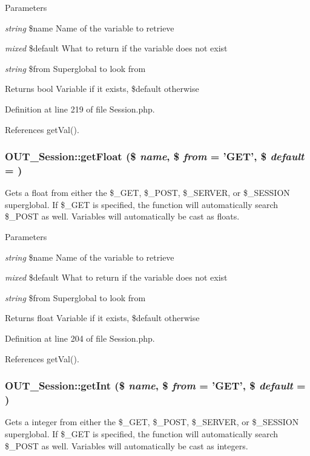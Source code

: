 \begin{DoxyParams}{Parameters}
\item[{\em string}]\$name Name of the variable to retrieve \item[{\em mixed}]\$default What to return if the variable does not exist \item[{\em string}]\$from Superglobal to look from\end{DoxyParams}
\begin{DoxyReturn}{Returns}
bool Variable if it exists, \$default otherwise 
\end{DoxyReturn}


Definition at line 219 of file Session.php.

References getVal().\hypertarget{classOUT__Session_ada05962a25467070b6ca9ffa6692d4c3}{
\subsubsection[{getFloat}]{\setlength{\rightskip}{0pt plus 5cm}OUT\_\-Session::getFloat (\$ {\em name}, \/  \$ {\em from} = {\ttfamily 'GET'}, \/  \$ {\em default} = {})}}
\label{d6/d75/classOUT__Session_ada05962a25467070b6ca9ffa6692d4c3}
Gets a float from either the \$\_\-GET, \$\_\-POST, \$\_\-SERVER, or \$\_\-SESSION superglobal. If \$\_\-GET is specified, the function will automatically search \$\_\-POST as well. Variables will automatically be cast as floats.


\begin{DoxyParams}{Parameters}
\item[{\em string}]\$name Name of the variable to retrieve \item[{\em mixed}]\$default What to return if the variable does not exist \item[{\em string}]\$from Superglobal to look from\end{DoxyParams}
\begin{DoxyReturn}{Returns}
float Variable if it exists, \$default otherwise 
\end{DoxyReturn}


Definition at line 204 of file Session.php.

References getVal().\hypertarget{classOUT__Session_a8df372b0cc4128399e6367f04c2219ab}{
\subsubsection[{getInt}]{\setlength{\rightskip}{0pt plus 5cm}OUT\_\-Session::getInt (\$ {\em name}, \/  \$ {\em from} = {\ttfamily 'GET'}, \/  \$ {\em default} = {})}}
\label{d6/d75/classOUT__Session_a8df372b0cc4128399e6367f04c2219ab}
Gets a integer from either the \$\_\-GET, \$\_\-POST, \$\_\-SERVER, or \$\_\-SESSION superglobal. If \$\_\-GET is specified, the function will automatically search \$\_\-POST as well. Variables will automatically be cast as integers.


